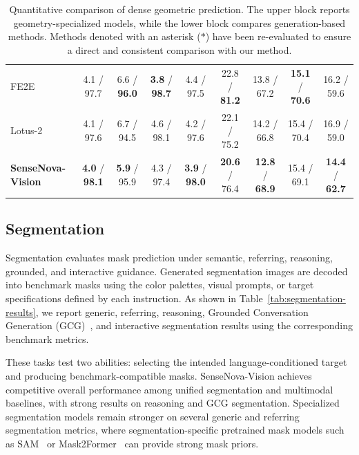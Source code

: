 \begin{table}[t]
\begin{tabular}{l|ccccc|ccc}
        FE2E~\cite{fe2e2025editor}                  & 4.1 / 97.7& 6.6 / \textbf{96.0}& \textbf{3.8} / \textbf{98.7}& 4.4 / 97.5                           & 22.8 / \textbf{81.2}& 13.8 / 67.2& \textbf{15.1} / \textbf{70.6}& 16.2 / 59.6\\
        Lotus-2~\cite{lotus2}                       & 4.1 / 97.6& 6.7 / 94.5                           & 4.6 / 98.1& 4.2 / 97.6& 22.1 / 75.2 & 14.2 / 66.8                         & 15.4 / 70.4          & 16.9 / 59.0                        \\
        \textbf{SenseNova-Vision}       & \textbf{4.0} / \textbf{98.1}& \textbf{5.9} / 95.9& 4.3 / 97.4& \textbf{3.9} / \textbf{98.0}& \textbf{20.6} / 76.4& \textbf{12.8} / \textbf{68.9}     & 15.4 / 69.1        & \textbf{14.4} / \textbf{62.7}\\
        \bottomrule
    \end{tabular}
    \caption{
        Quantitative comparison of dense geometric prediction.
        The upper block reports geometry-specialized models, while the lower block compares generation-based methods.
        Methods denoted with an asterisk ($\ast$) have been re-evaluated to ensure a direct and consistent comparison with our method.
    }
    \label{tab:dense-geometry-results}
\end{table}

\subsection{Segmentation}

Segmentation evaluates mask prediction under semantic, referring, reasoning, grounded, and interactive guidance.
Generated segmentation images are decoded into benchmark masks using the color palettes, visual prompts, or target specifications defined by each instruction.
As shown in Table~\ref{tab:segmentation-results}, we report generic, referring, reasoning, Grounded Conversation Generation (GCG)~\cite{rasheed2024glamm}, and interactive segmentation results using the corresponding benchmark metrics.

These tasks test two abilities: selecting the intended language-conditioned target and producing benchmark-compatible masks.
SenseNova-Vision achieves competitive overall performance among unified segmentation and multimodal baselines, with strong results on reasoning and GCG segmentation.
Specialized segmentation models remain stronger on several generic and referring segmentation metrics, where segmentation-specific pretrained mask models such as SAM~\cite{sam} or Mask2Former~\cite{mask2former} can provide strong mask priors.

